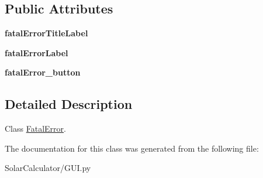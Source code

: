 \subsection*{Public Attributes}
\begin{DoxyCompactItemize}
\item 
\hypertarget{class_solar_calculator_1_1_g_u_i_1_1_fatal_error_a68a47f59f0e2234002326e93479bf90c}{{\bfseries fatal\-Error\-Title\-Label}}\label{class_solar_calculator_1_1_g_u_i_1_1_fatal_error_a68a47f59f0e2234002326e93479bf90c}

\item 
\hypertarget{class_solar_calculator_1_1_g_u_i_1_1_fatal_error_a0d233d0b1cc51bd6bda1dc1c15ad3e79}{{\bfseries fatal\-Error\-Label}}\label{class_solar_calculator_1_1_g_u_i_1_1_fatal_error_a0d233d0b1cc51bd6bda1dc1c15ad3e79}

\item 
\hypertarget{class_solar_calculator_1_1_g_u_i_1_1_fatal_error_a35c9abb785239836cbccb41c2fbedbaf}{{\bfseries fatal\-Error\-\_\-button}}\label{class_solar_calculator_1_1_g_u_i_1_1_fatal_error_a35c9abb785239836cbccb41c2fbedbaf}

\end{DoxyCompactItemize}


\subsection{Detailed Description}
Class \hyperlink{class_solar_calculator_1_1_g_u_i_1_1_fatal_error}{Fatal\-Error}. 

The documentation for this class was generated from the following file\-:\begin{DoxyCompactItemize}
\item 
Solar\-Calculator/G\-U\-I.\-py\end{DoxyCompactItemize}
